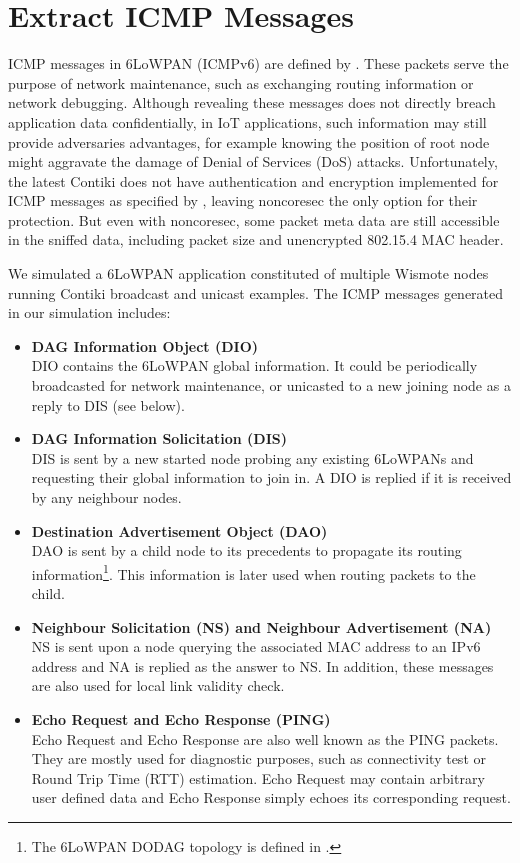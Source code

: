 \section{Extract ICMP Messages}
ICMP messages in 6LoWPAN (ICMPv6) are defined by \cite{rfc4443}. These packets serve the purpose of network maintenance, such as exchanging routing information or network debugging. Although revealing these messages does not directly breach application data confidentially, in IoT applications, such information may still provide adversaries advantages, for example knowing the position of root node might aggravate the damage of Denial of Services (DoS) attacks. Unfortunately, the latest Contiki does not have authentication and encryption implemented for ICMP messages as specified by \cite{rfc2463}, leaving noncoresec the only option for their protection. But even with noncoresec, some packet meta data are still accessible in the sniffed data, including packet size and unencrypted 802.15.4 MAC header.

We simulated a 6LoWPAN application constituted of multiple Wismote\cite{Wismote} nodes running Contiki broadcast and unicast examples. The ICMP messages generated in our simulation includes:
\begin{itemize}
	\item \textbf{DAG Information Object (DIO)} \\
	DIO contains the 6LoWPAN global information. It could be periodically broadcasted for network maintenance, or unicasted to a new joining node as a reply to DIS (see below).
	\item \textbf{DAG Information Solicitation (DIS)} \\
	DIS is sent by a new started node probing any existing 6LoWPANs and requesting their global information to join in. A DIO is replied if it is received by any neighbour nodes.
	\item \textbf{Destination Advertisement Object (DAO)} \\
	DAO is sent by a child node to its precedents to propagate its routing information\footnote{The 6LoWPAN DODAG topology is defined in \cite{rfc6550}.}. This information is later used when routing packets to the child.
	\item \textbf{Neighbour Solicitation (NS) and Neighbour Advertisement (NA)} \\
	NS is sent upon a node querying the associated MAC address to an IPv6 address and NA is replied as the answer to NS. In addition, these messages are also used for local link validity check.
	\item \textbf{Echo Request and Echo Response (PING)} \\
	Echo Request and Echo Response are also well known as the PING packets. They are mostly used for diagnostic purposes, such as connectivity test or Round Trip Time (RTT) estimation. Echo Request may contain arbitrary user defined data and Echo Response simply echoes its corresponding request.
\end{itemize}

